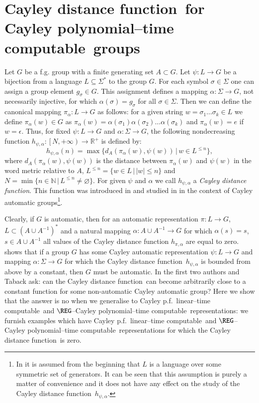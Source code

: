 \documentclass[article,12pt]{elsarticle}
\newcommand\distfun{Cayley distance function}
\newcommand\linearC{Cayley p.f.~linear--time computable}
\newcommand\polyC{Cayley polynomial--time computable}
\begin{document}
\section{\distfun\ for \polyC\ groups}
\label{characterization_section}

 
 Let $G$ be a f.g. group with 
 a finite generating set $A \subset G$.  
 Let $\psi: L \rightarrow G$ be a bijection
from a language $L \subseteq \Sigma^*$ 
to the group $G$.
For each symbol $\sigma \in \Sigma$ 
one can assign a group element $g_\sigma \in G$. 
This assignment defines a mapping 
$\alpha : \Sigma \rightarrow G$, 
not necessarily injective, for which 
$\alpha (\sigma ) = g_\sigma$ for all 
$\sigma \in \Sigma$. 
Then we can define the canonical mapping 
$\pi_\alpha : L \rightarrow G$ as follows: 
for a given string
$w  = \sigma_1 \dots \sigma_k \in L$ we define 
$\pi_\alpha(w) \in G$ as $\pi_\alpha (w) = \alpha(\sigma_1) \alpha(\sigma_2) \dots \alpha(\sigma_k)$
and $\pi_\alpha(w)=e$ if $w= \epsilon$. Thus, for 
fixed $\psi: L \rightarrow G$ and 
$\alpha: \Sigma \rightarrow G$, the following 
nondecreasing function 
$h_{\psi,\alpha}: \left[N, + \infty \right) 
\rightarrow \mathbb{R}^+$ is defined by:  
\begin{equation} 
\label{h_function_def}   
h_{\psi,\alpha}(n) = \max\{d_A (\pi_\alpha(w),\psi(w))\,|\,
w \in L^{\leqslant n} \},  
\end{equation} 
where $d_A (\pi_\alpha(w),\psi(w))$ is the distance 
between $\pi_\alpha (w)$ and $\psi(w)$ in the word
metric relative to $A$, 
$L^{\leqslant n} = \{w \in L \, | \, 
|w| \leqslant n\}$ and 
$N = \min \{n \in \mathbb{N} \, | \,
L^{\leqslant n} \neq \varnothing\}$.  
For given $\psi$ and $\alpha$ we call 
$h_{\psi,\alpha}$ a {\em \distfun}.     
This function 
was introduced  in 
\cite{BT_LATA18} and studied in \cite{eastwest19,BET19} in the context of Cayley automatic groups\footnote{In \cite{BT_LATA18,eastwest19} 
	it is assumed from 
	the beginning that $L$ is a language over some 
	symmetric set of generators. 
	It can be seen that this assumption is purely 
	a matter of convenience and it does not 
	have any effect on the study of 
	the \distfun\ $h_{\psi,\alpha}$.}.    

 
 Clearly, if $G$ is automatic, 
 then for an automatic representation 
 $\pi: L \to G$, $L \subset (A \cup A^{-1})^*$ 
 and a natural mapping $\alpha: A \cup A^{-1} 
 \rightarrow G$ for which $\alpha (s)=s$, 
 $s \in A \cup A^{-1}$  
 all values of the Cayley 
 distance function $h_{\pi,\alpha}$
 are equal to zero. 
 \cite[Theorem~8]{BT_LATA18} shows that
 if a group $G$ has  some Cayley automatic representation 
 $\psi : L \rightarrow G$ and mapping  
 $\alpha : \Sigma \rightarrow G$ for which the 
 \distfun\ $h_{\psi,\alpha}$ is bounded from above by a constant, 
 then $G$ must be automatic.
In \cite{BET19} the first two authors and Taback ask: can the \distfun\ can become arbitrarily close to a constant function for some non-automatic Cayley automatic group?
Here we show that the answer is no when we generalise to \linearC\ and $\REG$--\polyC\ representations: 
we furnish examples which have  \linearC\ and $\REG$--\polyC\  representations %
for which the \distfun\ is zero.
\end{document}
